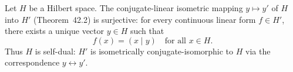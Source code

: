 Let $H$ be a Hilbert space. The conjugate-linear isometric mapping $y \mapsto y'$ of $H$ into $H'$ (Theorem~42.2) is surjective: for every continuous linear form $f \in H'$, there exists a unique vector $y \in H$ such that
$$f(x) = (x \mid y) \quad \text{for all } x \in H.$$
Thus $H$ is self-dual: $H'$ is isometrically conjugate-isomorphic to $H$ via the correspondence $y \leftrightarrow y'$.
